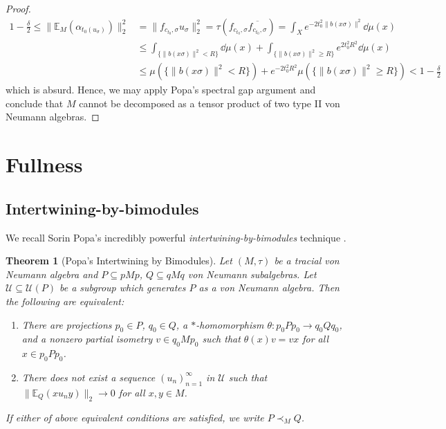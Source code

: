 \documentclass[a4paper,11pt]{article}
\numberwithin{equation}{section}
\newtheorem{thm}{Theorem}[section]
\theoremstyle{definition}
\theoremstyle{remark}
\numberwithin{equation}{section}
\newcommand{\E}{\mathbb{E}}
\newcommand{\U}{\mathcal{U}}
\def\sub{\subseteq}
\providecommand{\norm}[1]{\lVert#1\rVert}
\newcommand*\cls[1]{\overline{#1}}
\numberwithin{equation}{section}
\begin{document}
\begin{proof}
    \begin{align*}
        1-\frac{\delta}{2} \leq \norm{\E_{M}(\alpha_{t_{0}(u_{\sigma})})}_{2}^{2} &= \norm{f_{c_{t_0},\sigma}u_{\sigma}}_{2}^{2} = \tau ( f_{c_{t_{0}},\sigma} \cls{ f_{c_{t_{0}},\sigma}}) = \int_{X} e^{-2t_{0}^2 \norm{b(x \sigma)}^{2}} \dd{\mu(x)} \\
        &\leq \int_{\{\norm{b(x \sigma)}^{2}< R\}} \dd{\mu(x)} + \int_{\{\norm{b(x \sigma)}^{2} \geq R\}}e^{2t_{0}^{2}R^{2}}\dd{\mu(x)}\\
        &\leq \mu(\{\norm{b(x \sigma)}^{2}< R\}) + e^{-2t_{0}^{2}R^{2}} \mu(\{\norm{b(x \sigma)}^{2}\geq R\})  < 1- \frac{\delta}{2}
    \end{align*}
    which is absurd. Hence, we may apply Popa's spectral gap argument and conclude that $ M $ cannot be decomposed as a tensor product of two type II von Neumann algebras.


\end{proof}


\section{Fullness}
\subsection{Intertwining-by-bimodules}
We recall Sorin Popa's incredibly powerful \textit{intertwining-by-bimodules} technique \cite[Theorem 2.1]{popa:03}.
\begin{thm}[Popa's Intertwining by Bimodules]
    Let $ (M,\tau) $ be a tracial von Neumann algebra and $ P\sub pMp $, $ Q\sub qMq $ von Neumann subalgebras. Let $ \U\sub \U(P) $ be a subgroup which generates $ P $ as a von Neumann algebra. Then the following are equivalent:
    \begin{enumerate}
        \item There are projections $ p_{0}\in P $, $ q_{0}\in Q $, a $ * $-homomorphism $ \theta:p_{0}Pp_{0}\to q_{0}Qq_{0} $, and a nonzero partial isometry $ v\in q_{0}Mp_{0} $ such that $ \theta(x)v = vx $ for all $ x\in p_{0}Pp_{0} $.
        \item There does not exist a sequence $ (u_{n})_{n=1}^{\infty} $ in $ \U $ such that $ \norm{\E_{Q}(xu_{n}y)}_{2}\to0 $ for all $ x,y\in M $.
    \end{enumerate}
    If either of above equivalent conditions are satisfied, we write $ P\prec_{M}Q $.
\end{thm}
\end{document}
